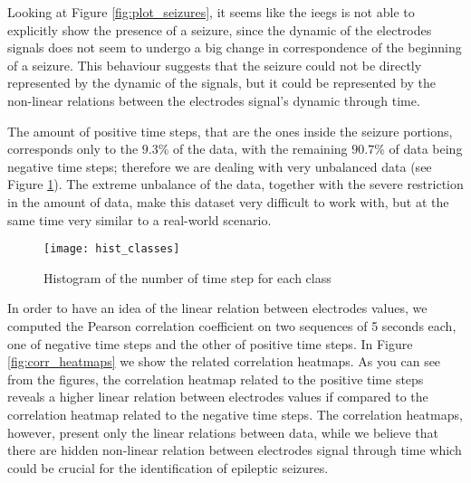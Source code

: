 \newpage

Looking at Figure \ref{fig:plot_seizures}, it seems like the \acsp{ieeg} is not able to explicitly show the presence of a seizure, since the dynamic of the electrodes signals does not seem to undergo a big change in correspondence of the beginning of a seizure. This behaviour suggests that the seizure could not be directly represented by the dynamic of the signals, but it could be represented by the non-linear relations between the electrodes signal's dynamic through time.

The amount of positive time steps, that are the ones inside the seizure portions, corresponds only to the $9.3$\% of the data, with the remaining $90.7$\% of data being negative time steps; therefore we are dealing with very unbalanced data (see Figure \ref{fig:hist_classes}). The extreme unbalance of the data, together with the severe restriction in the amount of data, make this dataset very difficult to work with, but at the same time very similar to a real-world scenario.
\begin{figure}[htbp]
    \centering
    \texttt{[image: hist\_classes]}
    \caption{Histogram of the number of time step for each class}
    \label{fig:hist_classes}
\end{figure}

In order to have an idea of the linear relation between electrodes values, we computed the Pearson correlation coefficient on two sequences of 5 seconds each, one of negative time steps and the other of positive time steps. In Figure \ref{fig:corr_heatmaps} we show the related correlation heatmaps. As you can see from the figures, the correlation heatmap related to the positive time steps reveals a higher linear relation between electrodes values if compared to the correlation heatmap related to the negative time steps. The correlation heatmaps, however, present only the linear relations between data, while we believe that there are hidden non-linear relation between electrodes signal through time which could be crucial for the identification of epileptic seizures.

